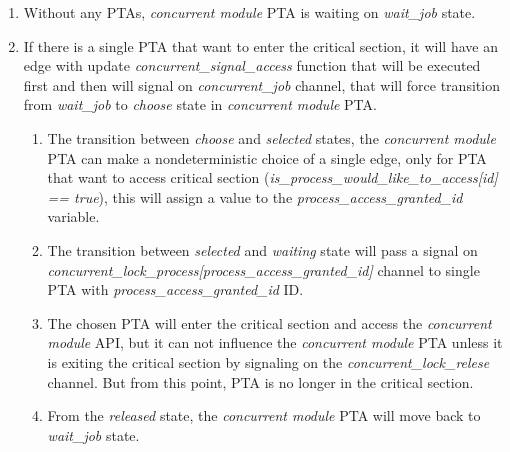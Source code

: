 \begin{enumerate}
\begin{enumerate}
\item Without any PTAs, \textit{concurrent module} PTA is waiting on \textcolor{ColorUppaalState}{\textit{wait_job}} state. 
\item If there is a single PTA that want to enter the critical section, it will have an edge with update \textcolor{ColorUppaalFunction}{\textit{concurrent_signal_access}} function that will be executed first and then will signal on \textcolor{ColorUppaalChannel}{\textit{concurrent_job}} channel, that will force transition from \textcolor{ColorUppaalState}{\textit{wait_job}} to \textcolor{ColorUppaalState}{\textit{choose}} state in \textit{concurrent module} PTA.
\begin{enumerate} 
\item The transition between \textcolor{ColorUppaalState}{\textit{choose}} and \textcolor{ColorUppaalState}{\textit{selected}} states, the \textit{concurrent module} PTA can make a nondeterministic choice of a single edge, only for PTA that want to access critical section (\textcolor{ColorEdgeGuard}{\textit{is_process_would_like_to_access[id] == true}}), this will assign a value to the \textcolor{ColorEdgeGuard}{\textit{process_access_granted_id}} variable.  
\item The transition between \textcolor{ColorUppaalState}{\textit{selected}} and \textcolor{ColorUppaalState}{\textit{waiting}} state will pass a signal on \textcolor{ColorUppaalChannel}{\textit{concurrent_lock_process[\textcolor{ColorEdgeGuard}{\textit{process_access_granted_id}}]}} channel to single PTA with \textcolor{ColorEdgeGuard}{\textit{process_access_granted_id}} ID.  
\item The chosen PTA will enter the critical section and access the \textit{concurrent module} API, but it can not influence the \textit{concurrent module} PTA unless it is exiting the critical section by signaling on the \textcolor{ColorUppaalChannel}{\textit{concurrent_lock_relese}} channel. But from this point, PTA is no longer in the critical section. 
\item From the \textcolor{ColorUppaalState}{\textit{released}} state, the \textit{concurrent module} PTA will move back to \textcolor{ColorUppaalState}{\textit{wait_job}} state.
\end{enumerate} 

\end{enumerate}
\end{enumerate}
